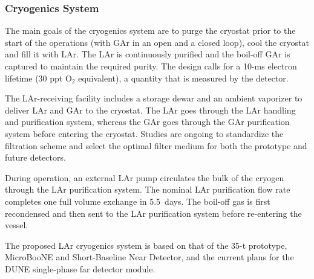\subsubsection{Cryogenics System}

The main goals of the cryogenics system are to purge the cryostat
prior to the start of the operations (with GAr in an open and a closed
loop), %
cool the cryostat and fill it
with LAr.  The LAr is continuously purified and the boil-off GAr is
captured to maintain the required purity.
The design calls for a 10-ms electron lifetime (30 ppt
O$_2$ equivalent), a quantity that is measured by the detector.

The LAr-receiving facility includes a storage dewar and an ambient
vaporizer to deliver LAr and GAr to the cryostat. The LAr goes through
the LAr handling and purification system, whereas the GAr goes through
the GAr purification system before entering the cryostat.  Studies are
ongoing to standardize the filtration scheme and select the optimal
filter medium for both the prototype and future detectors.

During operation, an external LAr pump circulates the bulk of the
cryogen through the LAr purification system. The nominal LAr
purification flow rate completes one full volume exchange in 5.5~days.
The boil-off gas is first recondensed and then sent to the LAr
purification system before re-entering the vessel.

The proposed LAr cryogenics system is based on that of the 35-t
prototype, MicroBooNE and Short-Baseline Near Detector,
and the current plans for the DUNE single-phase far detector module.
